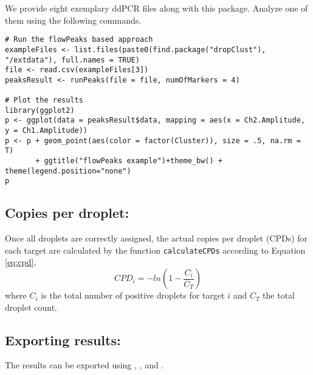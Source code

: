 \documentclass{article}
\begin{document}
We provide eight exemplary ddPCR files along with this package. Analyze one of them using the following commands.
\begin{verbatim}
# Run the flowPeaks based approach
exampleFiles <- list.files(paste0(find.package("dropClust"), "/extdata"), full.names = TRUE)
file <- read.csv(exampleFiles[3])
peaksResult <- runPeaks(file = file, numOfMarkers = 4)

# Plot the results
library(ggplot2)
p <- ggplot(data = peaksResult$data, mapping = aes(x = Ch2.Amplitude, y = Ch1.Amplitude))
p <- p + geom_point(aes(color = factor(Cluster)), size = .5, na.rm = T) 
       + ggtitle("flowPeaks example")+theme_bw() + theme(legend.position="none")
p
\end{verbatim}




\subsection{Copies per droplet:}
Once all droplets are correctly assigned, the actual copies per droplet (CPDs) for each target are calculated by the function \texttt{calculateCPDs} according to Equation \ref{eq:cpd},
\begin{equation}\label{eq:cpd}
CPD_i = -ln(1-\frac{C_i}{C_T})
\end{equation}
where $C_i$ is the total number of positive droplets for target $i$ and $C_T$ the total droplet count.

\subsection{Exporting results:}
The results can be exported using , , and . 


\end{document}
